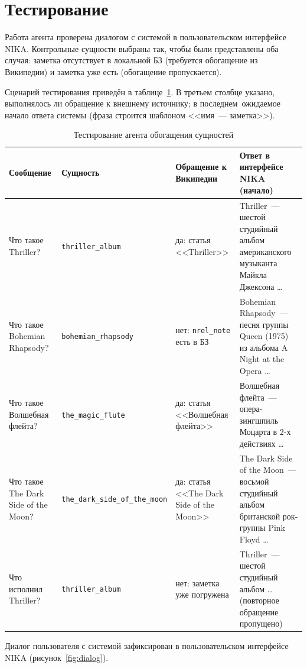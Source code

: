 \section{Тестирование}
\label{sec:test}

Работа агента проверена диалогом с системой в пользовательском интерфейсе NIKA. Контрольные сущности выбраны так, чтобы были представлены оба случая: заметка отсутствует в локальной БЗ (требуется обогащение из Википедии) и заметка уже есть (обогащение пропускается).

Сценарий тестирования приведён в таблице~\ref{tab:tests}. В третьем столбце указано, выполнялось ли обращение к внешнему источнику; в последнем~\mdash  ожидаемое начало ответа системы (фраза строится шаблоном <<имя~--- заметка>>).

\begin{table}[H]
	\centering
	\scriptsize
	\begin{tabular}{|p{3.6cm}|p{2.3cm}|p{2.6cm}|p{5.9cm}|}
		\hline
		Сообщение & Сущность & Обращение к Википедии & Ответ в интерфейсе NIKA (начало) \\
		\hline
		Что такое Thriller? & \texttt{thriller\_album} & да: статья <<Thriller>> & Thriller~--- шестой студийный альбом американского музыканта Майкла Джексона \ldots \\
		\hline
		Что такое Bohemian Rhapsody? & \texttt{bohemian\_rhapsody} & нет: \texttt{nrel\_note} есть в БЗ & Bohemian Rhapsody~--- песня группы Queen (1975) из альбома A Night at the Opera \ldots \\
		\hline
		Что такое Волшебная флейта? & \texttt{the\_magic\_flute} & да: статья <<Волшебная флейта>> & Волшебная флейта~--- опера-зингшпиль Моцарта в 2-х действиях \ldots \\
		\hline
		Что такое The Dark Side of the Moon? & \texttt{the\_dark\_side\newline\_of\_the\_moon} & да: статья <<The Dark Side of the Moon>> & The Dark Side of the Moon~--- восьмой студийный альбом британской рок-группы Pink Floyd \ldots \\
		\hline
		Что исполнил Thriller? & \texttt{thriller\_album} & нет: заметка уже погружена & Thriller~--- шестой студийный альбом \ldots (повторное обращение пропущено) \\
		\hline
	\end{tabular}
	\caption{Тестирование агента обогащения сущностей}
	\label{tab:tests}
\end{table}

Диалог пользователя с системой зафиксирован в пользовательском интерфейсе NIKA (рисунок~\ref{fig:dialog}).

